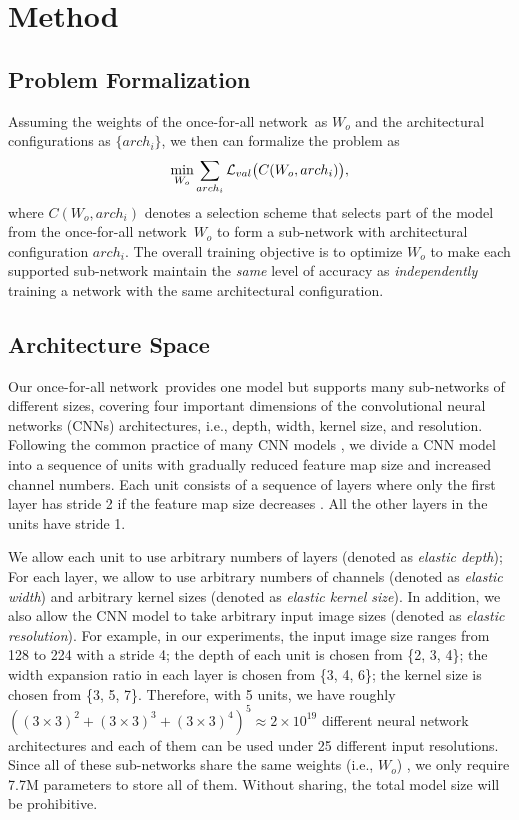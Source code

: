 \documentclass{article} \usepackage{iclr2020_conference,times}
\newcommand{\motherNet}{once-for-all network}
\begin{document}
\section{Method}

\subsection{Problem Formalization}
Assuming the weights of the \motherNet~as $W_o$ and the architectural configurations as $\{arch_i\}$, we then can formalize the problem as 
\begin{equation}\small
\label{eq:objective}
    \min_{W_o} \sum_{arch_i} \mathcal{L}_{val} \big( C(W_o, arch_i) \big),
\end{equation}
where $C(W_o, arch_i)$ denotes a selection scheme that selects part of the model from the \motherNet~$W_o$ to form a sub-network with architectural configuration $arch_i$. The overall training objective is to optimize $W_o$ to make each supported sub-network maintain the \textit{same} level of accuracy as \textit{independently} training a network with the same architectural configuration.


\subsection{Architecture Space}
Our \motherNet~provides one model but supports many sub-networks of different sizes, covering four important dimensions of the convolutional neural networks (CNNs) architectures, i.e., depth, width, kernel size, and resolution.  
Following the common practice of many CNN models \citep{he2016deep,sandler2018mobilenetv2,huang2017densely}, we divide a CNN model into a sequence of units with gradually reduced feature map size and increased channel numbers. Each unit consists of a sequence of layers where only the first layer has stride 2 if the feature map size decreases \citep{sandler2018mobilenetv2}. All the other layers in the units have stride 1. 

We allow each unit to use arbitrary numbers of layers (denoted as \emph{elastic depth}); For each layer, we allow to use arbitrary numbers of channels (denoted as \emph{elastic width}) and arbitrary kernel sizes (denoted as \emph{elastic kernel size}). In addition, we also allow the CNN model to take arbitrary input image sizes (denoted as \emph{elastic resolution}). For example, in our experiments, the input image size ranges from 128 to 224 with a stride 4; the depth of each unit is chosen from \{2, 3, 4\}; the width expansion ratio in each layer is chosen from \{3, 4, 6\}; the kernel size is chosen from \{3, 5, 7\}. Therefore, with 5 units, we have roughly $((3\times3)^2 + (3\times3)^3 + (3\times3)^4)^5 \approx 2 \times 10^{19}$ different neural network architectures and each of them can be used under 25 different input resolutions. Since all of these sub-networks share the same weights (i.e., $W_o$) \citep{Cheung2019superposition}, we only require 7.7M parameters to store all of them. Without sharing, the total model size will be prohibitive.
\end{document}
